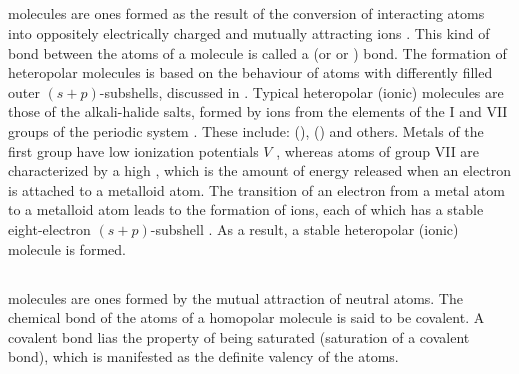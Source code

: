 \subsection{}\label{39.4.4}  molecules are ones formed as the result of the conversion of interacting atoms into oppositely electrically charged and mutually attracting ions . This kind of bond between the atoms of a molecule is called a  (or  or ) bond. The formation of heteropolar molecules is based on the behaviour of atoms with differently filled outer $(s + p)$-subshells, discussed in  . Typical heteropolar (ionic) molecules are those of the alkali-halide salts, formed by ions from the elements of the I and VII groups of the periodic system . These include:  (),  () and others. Metals of the first group have low ionization potentials $V$ , whereas atoms of group VII are characterized by a high , which is the amount of energy released when an electron is attached to a metalloid atom. The transition of an electron from a metal atom to a metalloid atom leads to the formation of ions, each of which has a stable eight-electron $(s + p)$-subshell . As a result, a stable heteropolar (ionic) molecule is formed.
\clearpage
\subsection{}\label{39.4.5}  molecules are ones formed by the mutual attraction of neutral atoms. The chemical bond of the atoms of a homopolar molecule is said to be covalent. A covalent bond lias the property of being saturated (saturation of a covalent bond), which is manifested as the definite valency of the atoms.

